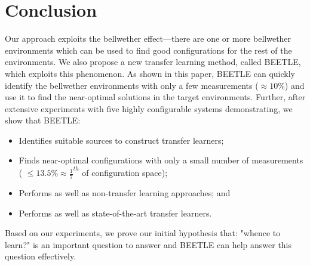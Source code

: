 \documentclass[10pt,journal,compsoc]{IEEEtran}
\newcommand{\bi}{\begin{itemize}}
\newcommand{\ei}{\end{itemize}}
\begin{document}
\section{Conclusion}
\label{sect:conclusion}
Our approach exploits the bellwether effect---there are one or more bellwether environments which can be used to find good configurations for the rest of the environments. We also propose a new transfer learning method, called BEETLE, which exploits this phenomenon. As shown in this paper,  BEETLE can quickly identify the bellwether environments with only a few measurements ($\approx10\%$) and use it to find the near-optimal solutions in the target environments. Further, after extensive experiments with five highly configurable systems demonstrating, we show that  BEETLE:
\bi
\item Identifies   suitable sources to construct transfer learners;
\item Finds near-optimal configurations with only a small number of measurements ( $\le13.5\%\approx \frac{1}{7}^{th}$ of configuration space);
\item 
Performs as well as non-transfer learning approaches; and 
\item
Performs as well as state-of-the-art transfer learners.
\ei
Based on our experiments, we prove our initial hypothesis that: "whence to learn?" is an important question to answer and BEETLE can help answer this question effectively.





\balance
 
\end{document}
